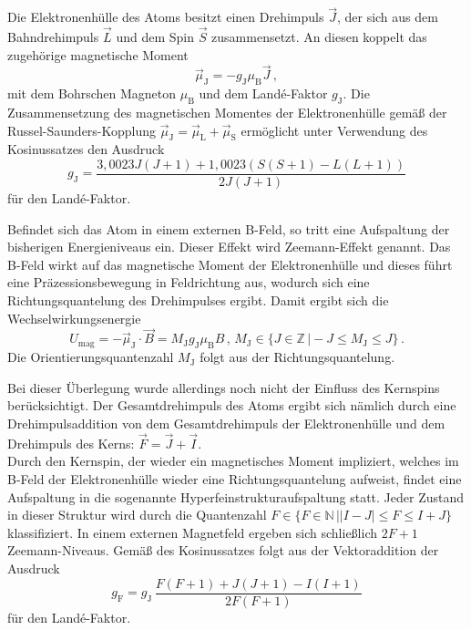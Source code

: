 Die Elektronenhülle des Atoms besitzt einen Drehimpuls $\vec{J}$, der sich aus dem
Bahndrehimpuls $\vec{L}$ und dem Spin $\vec{S}$ zusammensetzt. An diesen koppelt das
zugehörige magnetische Moment
\begin{equation}
	\vec{\mu}_{\mathrm{J}} = - g_{\mathrm{J}} \mu_{\mathrm{B}} \vec{J} \, \mathrm{,}
\end{equation}
mit dem Bohrschen Magneton $\mu_{\mathrm{B}}$ \cite{mu_0} und dem Land\'{e}-Faktor $g_{\mathrm{J}}$.
Die Zusammensetzung des magnetischen Momentes der Elektronenhülle gemäß der
Russel-Saunders-Kopplung $\vec{\mu}_{\mathrm{J}} = \vec{\mu}_{\mathrm{L}} + \vec{\mu}_{\mathrm{S}}$ ermöglicht unter
Verwendung des Kosinussatzes den Ausdruck
\begin{equation}
	g_{\mathrm{J}} = \frac{3,0023 J(J+1) + 1,0023 (S(S+1)-L(L+1))}{2J(J+1)}
\end{equation}
für den Land\'{e}-Faktor.

Befindet sich das Atom in einem externen B-Feld, so tritt eine Aufspaltung der bisherigen
Energieniveaus ein. Dieser Effekt wird Zeemann-Effekt genannt.
Das B-Feld wirkt auf das magnetische Moment der Elektronenhülle und dieses führt eine Präzessionsbewegung
in Feldrichtung aus, wodurch sich eine Richtungsquantelung des Drehimpulses ergibt. Damit
ergibt sich die Wechselwirkungsenergie
\begin{equation}
	U_{\mathrm{mag}} = - \vec{\mu}_{\mathrm{J}} \cdot \vec{B} = M_{\mathrm{J}} g_{\mathrm{J}} \mu_{\mathrm{B}} B \, \mathrm{,} \, M_{\mathrm{J}} \in \{J \in \mathbb{Z} \, \vert -J \le M_{\mathrm{J}} \le J\} \, \mathrm{.}
\end{equation}
Die Orientierungsquantenzahl $M_{\mathrm{J}}$ folgt aus der Richtungsquantelung.

Bei dieser Überlegung wurde allerdings noch nicht der Einfluss des Kernspins berücksichtigt.
Der Gesamtdrehimpuls des Atoms ergibt sich nämlich durch eine Drehimpulsaddition von dem
Gesamtdrehimpuls der Elektronenhülle und dem Drehimpuls des Kerns: $\vec{F}=\vec{J}+\vec{I}$.\\
Durch den Kernspin, der wieder ein magnetisches Moment impliziert, welches im B-Feld der
Elektronenhülle wieder eine Richtungsquantelung aufweist, findet eine Aufspaltung in die
sogenannte Hyperfeinstrukturaufspaltung statt. Jeder Zustand in dieser Struktur wird durch
die Quantenzahl $F \in \{F \in \mathbb{N} \, \vert |I-J| \le F \le I+J \}$ klassifiziert.
In einem externen Magnetfeld ergeben sich schließlich $2F+1$ Zeemann-Niveaus.
Gemäß des Kosinussatzes folgt aus der Vektoraddition der Ausdruck
\begin{equation}
	\label{eqn:g}
	g_{\mathrm{F}} = g_{\mathrm{J}} \, \frac{F(F+1)+J(J+1)-I(I+1)}{2F(F+1)}
\end{equation}
für den Land\'{e}-Faktor.
